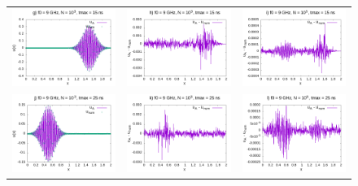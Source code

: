\documentclass[11pt,a4paper]{report}
\begin{document}
\begin{figure}
\begin{tabular}{ccc}
\includegraphics[width=55mm]{plots/9/mc9_3_15} &   \includegraphics[width=55mm]{plots/9/mc9_3_15_dif} &   \includegraphics[width=55mm]{plots/9/mc9_5_15_dif} \\
\includegraphics[width=55mm]{plots/9/mc9_3_25} &   \includegraphics[width=55mm]{plots/9/mc9_3_25_dif} &   \includegraphics[width=55mm]{plots/9/mc9_5_25_dif} \\

\end{tabular}
\end{figure}
\end{document}

